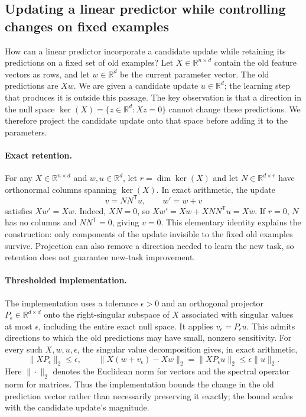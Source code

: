 \subsection{Updating a linear predictor while controlling changes on fixed examples}
\label{sec:prediction-retention}

How can a linear predictor incorporate a candidate update while retaining
its predictions on a fixed set of old examples? Let
\(X\in\mathbb{R}^{n\times d}\) contain the old feature vectors as rows,
and let \(w\in\mathbb{R}^d\) be the current parameter vector. The old
predictions are \(Xw\). We are given a candidate update
\(u\in\mathbb{R}^d\); the learning step that produces it is outside this
passage. The key observation is that a direction in the null space
\(\ker(X)=\{z\in\mathbb{R}^d:Xz=0\}\) cannot change these predictions.
We therefore project the candidate update onto that space before adding
it to the parameters.

\paragraph{Exact retention.}
For any \(X\in\mathbb{R}^{n\times d}\) and
\(w,u\in\mathbb{R}^d\), let \(r=\dim\ker(X)\) and let
\(N\in\mathbb{R}^{d\times r}\) have orthonormal columns spanning
\(\ker(X)\). In exact arithmetic, the update
\[
    v=NN^{\mathsf T}u,\qquad w'=w+v
\]
satisfies \(Xw'=Xw\).
Indeed, \(XN=0\), so
\(Xw'=Xw+XN N^{\mathsf T}u=Xw\).
If \(r=0\), \(N\) has no columns and \(NN^{\mathsf T}=0\), giving
\(v=0\). This elementary identity explains the construction: only
components of the update invisible to the fixed old examples survive.
Projection can also remove a direction needed to learn the new task, so
retention does not guarantee new-task improvement.

\paragraph{Thresholded implementation.}
The implementation uses a tolerance \(\epsilon>0\) and an orthogonal
projector \(P_\epsilon\in\mathbb{R}^{d\times d}\) onto the
right-singular subspace of \(X\) associated with singular values at most
\(\epsilon\), including the entire exact null space. It applies
\(v_\epsilon=P_\epsilon u\). This admits directions to which the old
predictions may have small, nonzero sensitivity. For every such
\(X,w,u,\epsilon\), the singular value decomposition gives, in exact
arithmetic,
\[
    \|XP_\epsilon\|_2\leq\epsilon,
    \qquad
    \|X(w+v_\epsilon)-Xw\|_2
    =\|XP_\epsilon u\|_2
    \leq\epsilon\|u\|_2.
\]
Here \(\|\cdot\|_2\) denotes the Euclidean norm for vectors and the
spectral operator norm for matrices. Thus the implementation bounds the
change in the old prediction vector rather than necessarily preserving
it exactly; the bound scales with the candidate update's magnitude.

